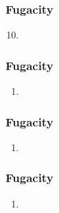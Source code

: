 \documentclass[10pt,compress,unknownkeysallowed]{beamer}
\begin{document}
\begin{frame}
  \frametitle{Fugacity}
        \begin{enumerate}\setcounter{enumi}{9}  
           \item<1-> 
           
               
        \end{enumerate}
\end{frame}
\normalsize


\begin{frame}
  \frametitle{Fugacity}
        \begin{enumerate}%
           \item<1-> 
           
               
        \end{enumerate}
\end{frame}
\normalsize


\begin{frame}
  \frametitle{Fugacity}
        \begin{enumerate}%
           \item<1-> 
           
               
        \end{enumerate}
\end{frame}
\normalsize


\begin{frame}
  \frametitle{Fugacity}
        \begin{enumerate}%
           \item<1-> 
           
               
        \end{enumerate}
\end{frame}
\normalsize
\end{document}

